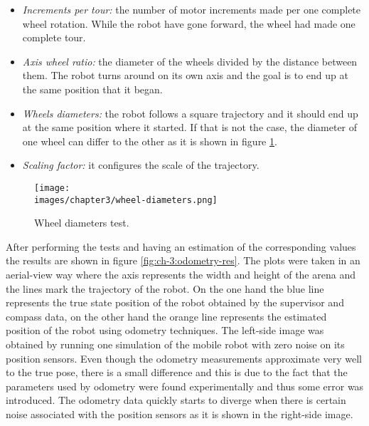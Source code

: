 \begin{itemize}
\item \textit{Increments per tour: } the number of motor increments made per one complete wheel rotation. While the robot have gone forward, the wheel had made one complete tour. 
\item \textit{Axis wheel ratio: } the diameter of the wheels divided by the distance between them. The robot turns around on its own axis and the goal is to end up at the same position that it began.
\item \textit{Wheels diameters: } the robot follows a square trajectory and it should end up at the same position where it started. If that is not the case, the diameter of one wheel can differ to the other as it is shown in figure \ref{fig:ch-3:wheel-diameters}.
\item \textit{Scaling factor: } it configures the scale of the trajectory.
\end{itemize}

\begin{figure}[h!]
  \centering
  \texttt{[image: \\images/chapter3/wheel-diameters.png]}
  \caption{Wheel diameters test.}
  \label{fig:ch-3:wheel-diameters}
\end{figure}

After performing the tests and having an estimation of the corresponding values the results are shown in figure \ref{fig:ch-3:odometry-res}.    The plots were taken in an aerial-view way where the axis represents the width and height of the arena and the lines mark the trajectory of the robot. On the one hand the blue line represents the true state position of the robot obtained by the supervisor and compass data, on the other hand the orange line represents the estimated position of the robot using odometry techniques. The left-side image was obtained by running one simulation of the mobile robot with zero noise on its position sensors. Even though the odometry measurements approximate very well to the true pose, there is a small difference and this is due to the fact that the parameters used by odometry were found experimentally and thus some error was introduced. The odometry data quickly starts to diverge when there is certain noise associated with the position sensors as it is shown in the right-side image.

